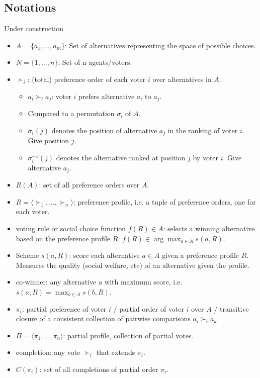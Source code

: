 \documentclass[12pt,a4paper]{article}
\begin{document}
\subsection*{Notations}
Under construction
\begin{itemize}
    \item $A = \{a_1, ..., a_m\}$: Set of alternatives representing the space of possible choices.
    \item $N = \{1, ..., n\}$: Set of n agents/voters.
    \item $\succ_i$: (total) preference order of each voter $i$ over alternatives in $A$.
    \begin{itemize}
        \item $a_i \succ_i a_j$: voter $i$ prefers alternative $a_i$ to $a_j$.
        \item Compared to a permutation $\sigma_i$ of $A$. 
        \item $\sigma_i(j)$ denotes the position of alternative $a_j$ in the ranking of voter $i$. Give position $j$.
        \item $\sigma_i^{-1}(j)$ denotes the alternative ranked at position $j$ by voter $i$. Give alternative $a_j$.
    \end{itemize}
    \item $R(A)$: set of all preference orders over $A$.
    \item $R = \langle \succ_1, ..., \succ_n \rangle $: preference profile, i.e. a tuple of preference orders, one for each voter.
    \item voting rule or social choice function $f(R) \in A$: selects a winning alternative based on the preference profile $R$. $f(R) \in \arg \max_{a \in A} s(a,R)$.
    \item Scheme $s(a, R)$: score each alternative $a \in A$ given a preference profile $R$. Measures the quality (social welfare, etc) of an alternative given the profile.
    \item co-winner: any alternative $a$ with maximum score, i.e. $s(a,R) = \max_{b \in A} s(b,R)$.
    \item $\pi_i$: partial preference of voter $i$ / partial order of voter $i$ over $A$ / transitive closure of a consistent collection of pairwise comparisons $a_i \succ_i a_k$
    \item $\Pi = \langle \pi_1, ..., \pi_n \rangle $: partial profile, collection of partial votes.
    \item completion: any vote $\succ_i$ that extends $\pi_i$.
    \item $C(\pi_i)$: set of all completions of partial order $\pi_i$.

\end{itemize}
\end{document}
